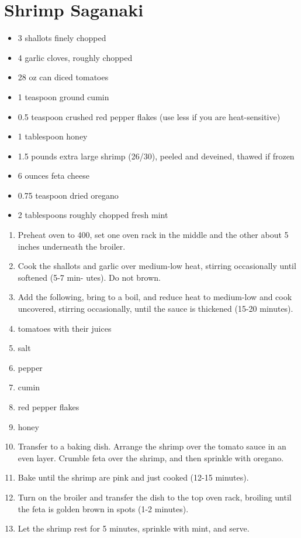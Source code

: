 \section{Shrimp Saganaki}

\begin{itemize}
\item 3 shallots finely chopped
\item 4 garlic cloves, roughly chopped
\item 28 oz can diced tomatoes
\item 1 teaspoon ground cumin
\item 0.5 teaspoon crushed red pepper flakes (use less if you are heat-sensitive)
\item 1 tablespoon honey
\item 1.5 pounds extra large shrimp (26/30), peeled and deveined, thawed if frozen
\item 6 ounces feta cheese
\item 0.75 teaspoon dried oregano
\item 2 tablespoons roughly chopped fresh mint
\end{itemize}

\begin{enumerate}
\item Preheat oven to 400, set one oven rack in the middle and the other about 5 inches underneath the broiler.
\item Cook the shallots and garlic over medium-low heat, stirring occasionally until softened (5-7 min- utes). Do not
    brown.
\item Add the following, bring to a boil, and reduce heat to medium-low and cook uncovered, stirring occasionally, until
    the sauce is thickened (15-20 minutes).
    \item tomatoes with their juices
    \item salt
    \item pepper
    \item cumin
    \item red pepper flakes
    \item honey
\item Transfer to a baking dish. Arrange the shrimp over the tomato sauce in an even layer. Crumble feta over the
    shrimp, and then sprinkle with oregano.
\item Bake until the shrimp are pink and just cooked (12-15 minutes).
\item Turn on the broiler and transfer the dish to the top oven rack, broiling until the feta is golden brown in spots
    (1-2 minutes).
\item Let the shrimp rest for 5 minutes, sprinkle with mint, and serve.
\end{enumerate}

